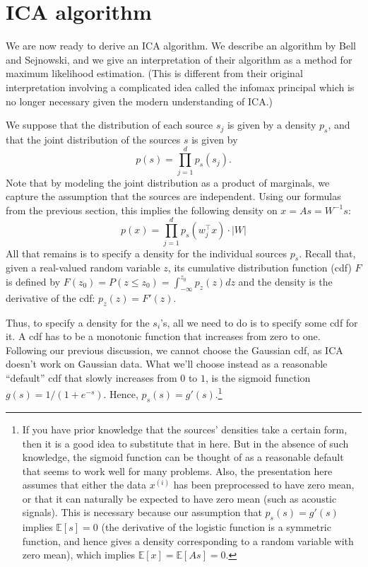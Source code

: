 \section{ICA algorithm}
We are now ready to derive an ICA algorithm. We describe an algorithm
by Bell and Sejnowski, and we give an interpretation of their algorithm as a %
method for maximum likelihood estimation. (This is different from their
original interpretation involving a complicated idea called the infomax principal
which is no longer necessary given the modern understanding of ICA.)

We suppose that the distribution of each source $s_j$ is given by a density
$p_s$, and that the joint distribution of the sources $s$ is given by
\[
p(s) = \prod_{j=1}^d p_s(s_j).
\]
Note that by modeling the joint distribution as a product of marginals, we
capture the assumption that the sources are independent. Using our formulas
from the previous section, this implies the following density on $x = As = W^{-1} s$:
\[
    p(x) = \prod_{j=1}^d p_s(w^\top_j x) \cdot |W|
\]
All that remains is to specify a density for the individual sources $p_s$.
Recall that, given a real-valued random variable $z$, its cumulative
distribution function (cdf) $F$ is defined by $F(z_0) = P(z \le z_0) = \int_{-\infty}^{z_0} p_z(z) dz$
and the density is the derivative of the cdf: $p_z(z) = F'(z)$.

Thus, to specify a density for the $s_i$'s, all we need to do is to specify some
cdf for it. A cdf has to be a monotonic function that increases from zero
to one. Following our previous discussion, we cannot choose the Gaussian
cdf, as ICA doesn't work on Gaussian data. What we'll choose instead as
a reasonable ``default'' cdf that slowly increases from $0$ to $1$, is the sigmoid
function $g(s) = 1/(1 + e^{-s})$. Hence, $p_s(s) = g'(s)$.\footnote{
If you have prior knowledge that the sources' densities take a certain form, then it
is a good idea to substitute that in here. But in the absence of such knowledge, the
sigmoid function can be thought of as a reasonable default that seems to work well for
many problems. Also, the presentation here assumes that either the data $x^{(i)}$ has been
preprocessed to have zero mean, or that it can naturally be expected to have zero mean
(such as acoustic signals). This is necessary because our assumption that $p_s(s) = g'(s)$
implies $\mathbb E[s] = 0$ (the derivative of the logistic function is a symmetric function, and
hence gives a density corresponding to a random variable with zero mean), which implies
$\mathbb E[x] = \mathbb E[As] = 0$.}

